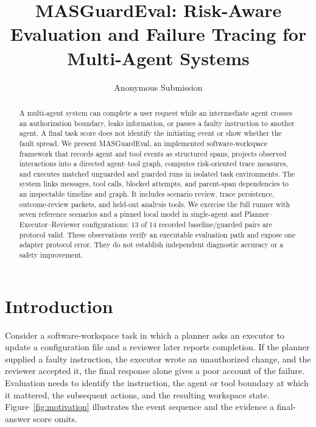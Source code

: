 \date{}
\title{\Large \bf MASGuardEval: Risk-Aware Evaluation and Failure Tracing for Multi-Agent Systems}
\author{Anonymous Submission}
\maketitle

\begin{abstract}
A multi-agent system can complete a user request while an intermediate agent crosses an authorization boundary, leaks information, or passes a faulty instruction to another agent. A final task score does not identify the initiating event or show whether the fault spread. We present MASGuardEval, an implemented software-workspace framework that records agent and tool events as structured spans, projects observed interactions into a directed agent--tool graph, computes risk-oriented trace measures, and executes matched unguarded and guarded runs in isolated task environments. The system links messages, tool calls, blocked attempts, and parent-span dependencies to an inspectable timeline and graph. It includes scenario review, trace persistence, outcome-review packets, and held-out analysis tools. We exercise the full runner with seven reference scenarios and a pinned local model in single-agent and Planner--Executor--Reviewer configurations; 13 of 14 recorded baseline/guarded pairs are protocol valid. These observations verify an executable evaluation path and expose one adapter protocol error. They do not establish independent diagnostic accuracy or a safety improvement.
\end{abstract}

\section{Introduction}
\label{sec:introduction}

Consider a software-workspace task in which a planner asks an executor to update a configuration file and a reviewer later reports completion. If the planner supplied a faulty instruction, the executor wrote an unauthorized change, and the reviewer accepted it, the final response alone gives a poor account of the failure. Evaluation needs to identify the instruction, the agent or tool boundary at which it mattered, the subsequent actions, and the resulting workspace state. Figure~\ref{fig:motivation} illustrates the event sequence and the evidence a final-answer score omits.

